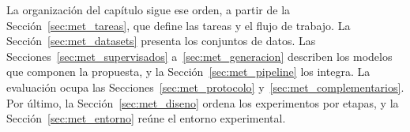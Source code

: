 La organización del capítulo sigue ese orden, a partir de la Sección~\ref{sec:met_tareas}, que define las tareas y el
flujo de trabajo. La Sección~\ref{sec:met_datasets} presenta los conjuntos de datos. Las
Secciones~\ref{sec:met_supervisados} a~\ref{sec:met_generacion} describen los modelos que componen la propuesta, y la
Sección~\ref{sec:met_pipeline} los integra. La evaluación
ocupa las Secciones~\ref{sec:met_protocolo} y~\ref{sec:met_complementarios}. Por último, la
Sección~\ref{sec:met_diseno} ordena los experimentos por etapas, y la Sección~\ref{sec:met_entorno} reúne el entorno
experimental.












